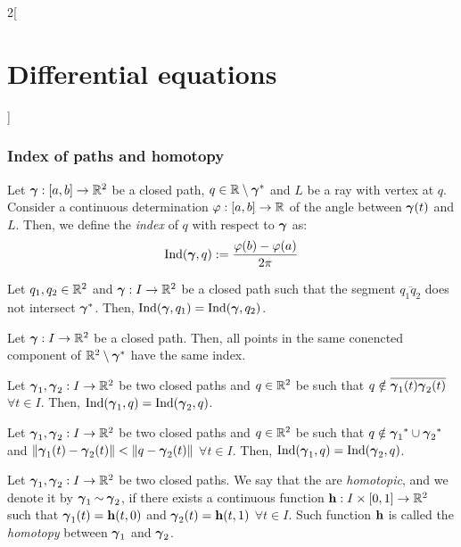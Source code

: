 \documentclass[../../../main.tex]{subfiles}
\begin{document}
\begin{multicols}{2}[\section{Differential equations}]
  \subsubsection{Index of paths and homotopy}
  \begin{definition}
    Let $\boldsymbol{\mathrm{\gamma}}:[a,b]\rightarrow\mathbb{R}^2$ be a closed path, $q\in \mathbb{R}\setminus\boldsymbol{\mathrm{\gamma}}^*$ and $L$ be a ray with vertex at $q$. Consider a continuous determination $\varphi:[a,b]\rightarrow\mathbb{R}$ of the angle between $\boldsymbol{\mathrm{\gamma}}(t)$ and $L$. Then, we define the \emph{index} of $q$ with respect to $\boldsymbol{\mathrm{\gamma}}$ as: $$\operatorname{Ind}(\boldsymbol{\mathrm{\gamma}},q):=\frac{\varphi(b)-\varphi(a)}{2\pi}$$
  \end{definition}
  \begin{proposition}
    Let $q_1,q_2\in\mathbb{R}^2$ and $\boldsymbol{\mathrm{\gamma}}:I\rightarrow\mathbb{R}^2$ be a closed path such that the segment $\overline{q_1q_2}$ does not intersect $\boldsymbol{\mathrm{\gamma}}^*$. Then, $\operatorname{Ind}(\boldsymbol{\mathrm{\gamma}},q_1)=\operatorname{Ind}(\boldsymbol{\mathrm{\gamma}},q_2)$.
  \end{proposition}
  \begin{corollary}
    Let $\boldsymbol{\mathrm{\gamma}}:I\rightarrow\mathbb{R}^2$ be a closed path. Then, all points in the same conencted component of $\mathbb{R}^2\setminus\boldsymbol{\mathrm{\gamma}}^*$ have the same index.
  \end{corollary}
  \begin{proposition}
    Let $\boldsymbol{\mathrm{\gamma}}_1,\boldsymbol{\mathrm{\gamma}}_2:I\rightarrow\mathbb{R}^2$ be two closed paths and $q\in\mathbb{R}^2$ be such that $q\notin\overline{\boldsymbol{\mathrm{\gamma}}_1(t)\boldsymbol{\mathrm{\gamma}}_2(t)}$ $\forall t\in I$. Then, $\operatorname{Ind}(\boldsymbol{\mathrm{\gamma}}_1,q)=\operatorname{Ind}(\boldsymbol{\mathrm{\gamma}}_2,q)$.
  \end{proposition}
  \begin{proposition}
    Let $\boldsymbol{\mathrm{\gamma}}_1,\boldsymbol{\mathrm{\gamma}}_2:I\rightarrow\mathbb{R}^2$ be two closed paths and $q\in\mathbb{R}^2$ be such that $q\notin{\boldsymbol{\mathrm{\gamma}}_1}^*\cup{\boldsymbol{\mathrm{\gamma}}_2}^*$ and $\|\boldsymbol{\mathrm{\gamma}}_1(t)-\boldsymbol{\mathrm{\gamma}}_2(t)\|<\|q-\boldsymbol{\mathrm{\gamma}}_2(t)\|$ $\forall t\in I$. Then, $\operatorname{Ind}(\boldsymbol{\mathrm{\gamma}}_1,q)=\operatorname{Ind}(\boldsymbol{\mathrm{\gamma}}_2,q)$.
  \end{proposition}
  \begin{definition}
    Let $\boldsymbol{\mathrm{\gamma}}_1,\boldsymbol{\mathrm{\gamma}}_2:I\rightarrow\mathbb{R}^2$ be two closed paths. We say that the are \emph{homotopic}, and we denote it by $\boldsymbol{\mathrm{\gamma}}_1\mathbin{\sim}\boldsymbol{\mathrm{\gamma}}_2$, if there exists a continuous function $\boldsymbol{\mathrm{h}}:I\times[0,1]\rightarrow\mathbb{R}^2$ such that $\boldsymbol{\mathrm{\gamma}}_1(t)=\boldsymbol{\mathrm{h}}(t,0)$ and $\boldsymbol{\mathrm{\gamma}}_2(t)=\boldsymbol{\mathrm{h}}(t,1)$ $\forall t\in I$. Such function $\boldsymbol{\mathrm{h}}$ is called the \emph{homotopy} between $\boldsymbol{\mathrm{\gamma}}_1$ and $\boldsymbol{\mathrm{\gamma}}_2$.
  \end{definition}
  \begin{lemma}

\end{lemma}
\end{multicols}
\end{document}
